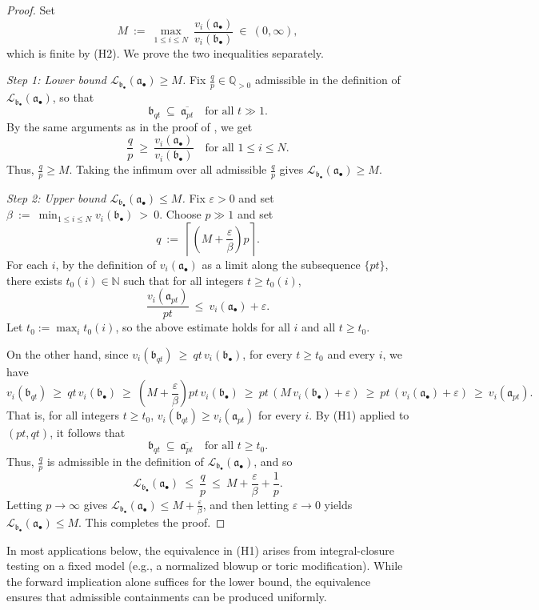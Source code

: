 \documentclass[12pt]{amsart}
\newcommand{\NN}{\mathbb{N}}
\newcommand{\QQ}{\mathbb{Q}}
\renewcommand{\a}{\mathfrak{a}}
\renewcommand{\b}{\mathfrak{b}}
\newcommand{\Loj}{\mathcal{L}} %
\newcommand{\abul}{{\a_\bullet}}
\newcommand{\bbul}{{\b_\bullet}}
\theoremstyle{plain}
\theoremstyle{definition}
\numberwithin{equation}{section}
\begin{document}
\begin{proof}
	Set
	\[
	M \ :=\ \max_{1\le i\le N}\ \frac{v_i(\abul)}{v_i(\bbul)} \ \in\ (0,\infty),
	\]
	which is finite by {\rm(H2)}. We prove the two inequalities separately.
	
	\smallskip
	\noindent
	\emph{Step 1: Lower bound $\Loj_{\bbul}(\abul)\ge M$.}
	Fix $\frac{q}{p}\in\QQ_{>0}$ admissible in the definition of $\Loj_{\bbul}(\abul)$, so that
	\[
	\b_{qt}\ \subseteq\ \overline{\a_{pt}}\quad \text{for all }t\gg 1.
	\]
	By the same arguments as in the proof of , we get
	\[
	\frac{q}{p}\ \ge\ \frac{v_i(\abul)}{v_i(\bbul)}\quad \text{for all }1\le i\le N.
	\]
Thus, $\frac{q}{p}\ge M$. Taking the infimum over all admissible $\frac{q}{p}$ gives
	$\Loj_{\bbul}(\abul)\ge M$.
	
	\smallskip
	\noindent
	\emph{Step 2: Upper bound $\Loj_{\bbul}(\abul)\le M$.}
	Fix $\varepsilon>0$ and set $\beta \ :=\ \min_{1\le i\le N} v_i(\bbul)\ >\ 0.$
Choose $p\gg 1$ and set
	\[
	q \ :=\ \left\lceil \left(M+\frac{\varepsilon}{\beta}\right)p\right\rceil.
	\]
	For each $i$, by the definition of $v_i(\abul)$ as a limit along the subsequence $\{pt\}$,
	there exists $t_0(i)\in\NN$ such that for all integers $t\ge t_0(i)$,
	\[
	\frac{v_i(\a_{pt})}{pt}\ \le\ v_i(\abul)+\varepsilon.
	\]
	Let $t_0:=\max_i t_0(i)$, so the above estimate holds for all $i$ and all $t\ge t_0$.
	
	On the other hand, since $v_i(\b_{qt})\ \ge\ qt\,v_i(\bbul)$, for every $t\ge t_0$ and every $i$, we have
	\[
	v_i(\b_{qt})
	\ \ge\ qt\,v_i(\bbul)
	\ \ge\ \left(M+\frac{\varepsilon}{\beta}\right)pt\,v_i(\bbul)
	\ \ge\ pt\,(M\,v_i(\bbul)+\varepsilon)
	\ \ge\ pt\,(v_i(\abul)+\varepsilon)
	\ \ge\ v_i(\a_{pt}).
	\]
	That is, for all integers $t\ge t_0$, $v_i(\b_{qt})\ge v_i(\a_{pt})$ for every $i$.
	By {\rm(H1)} applied to $(pt,qt)$, it follows that
	\[
	\b_{qt}\ \subseteq\ \overline{\a_{pt}}\quad \text{for all }t\ge t_0.
	\]
	Thus, $\frac{q}{p}$ is admissible in the definition of $\Loj_{\bbul}(\abul)$, and so
	\[
	\Loj_{\bbul}(\abul)\ \le\ \frac{q}{p}
	\ \le\ M+\frac{\varepsilon}{\beta}+\frac{1}{p}.
	\]
	Letting $p\to\infty$ gives $\Loj_{\bbul}(\abul)\le M+\frac{\varepsilon}{\beta}$, and then
	letting $\varepsilon\to 0$ yields $\Loj_{\bbul}(\abul)\le M$.
This completes the proof.
\end{proof}

In most applications below, the equivalence in (H1) arises from integral-closure testing on a fixed model (e.g., a normalized blowup or toric modification). While the forward implication alone suffices for the lower bound, the equivalence ensures that admissible containments can be produced uniformly.
\end{document}
